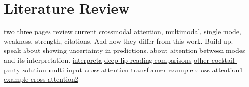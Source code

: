 \chapter{Literature Review} 
\label{chapter-3} 


two three pages review current crossmodal attention, multimodal, single mode, weakness, strength, citations. And how they differ from this work. Build up.
speak about showing uncertainty in predictions. about attention between modes and its interpretation.
\href{https://openreview.net/pdf?id=BJ5UeU9xx}{interpreta}
\href{https://arxiv.org/abs/1806.06053}{deep lip reading comparisons}
\href{https://arxiv.org/pdf/1804.03619.pdf}{other cocktail-party solution}
\href{https://arxiv.org/pdf/1811.04716v1.pdf}{multi input cross attention transformer}
\href{https://www.aclweb.org/anthology/N18-2125}{example cross attention1}
\href{https://arxiv.org/pdf/1810.12829.pdf}{example cross attention2}